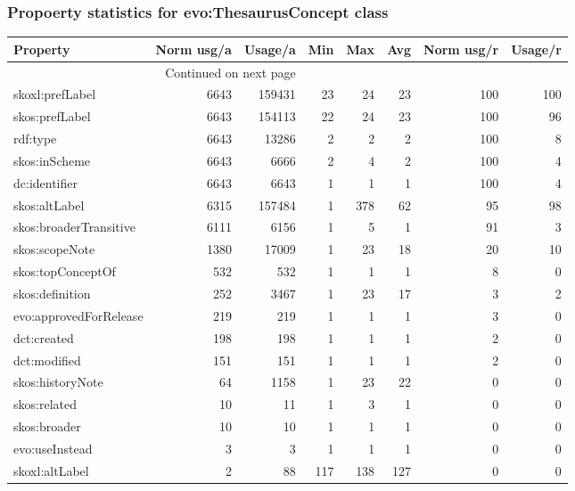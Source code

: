 \documentclass[10pt,a4paper,titlepage,final]{article}
\begin{document}
\subsubsection{Propoerty statistics for evo:ThesaurusConcept class}
\begin{longtable}{lrrrrrrr}
\toprule
               Property &  Norm usg/a &  Usage/a &  Min &  Max &  Avg &  Norm usg/r &  Usage/r \\
\midrule
\endhead
\midrule
\multicolumn{3}{r}{{Continued on next page}} \\
\midrule
\endfoot

\bottomrule
\endlastfoot
        skoxl:prefLabel &        6643 &   159431 &   23 &   24 &   23 &         100 &      100 \\
         skos:prefLabel &        6643 &   154113 &   22 &   24 &   23 &         100 &       96 \\
               rdf:type &        6643 &    13286 &    2 &    2 &    2 &         100 &        8 \\
          skos:inScheme &        6643 &     6666 &    2 &    4 &    2 &         100 &        4 \\
          dc:identifier &        6643 &     6643 &    1 &    1 &    1 &         100 &        4 \\
          skos:altLabel &        6315 &   157484 &    1 &  378 &   62 &          95 &       98 \\
 skos:broaderTransitive &        6111 &     6156 &    1 &    5 &    1 &          91 &        3 \\
         skos:scopeNote &        1380 &    17009 &    1 &   23 &   18 &          20 &       10 \\
      skos:topConceptOf &         532 &      532 &    1 &    1 &    1 &           8 &        0 \\
        skos:definition &         252 &     3467 &    1 &   23 &   17 &           3 &        2 \\
 evo:approvedForRelease &         219 &      219 &    1 &    1 &    1 &           3 &        0 \\
            dct:created &         198 &      198 &    1 &    1 &    1 &           2 &        0 \\
           dct:modified &         151 &      151 &    1 &    1 &    1 &           2 &        0 \\
       skos:historyNote &          64 &     1158 &    1 &   23 &   22 &           0 &        0 \\
           skos:related &          10 &       11 &    1 &    3 &    1 &           0 &        0 \\
           skos:broader &          10 &       10 &    1 &    1 &    1 &           0 &        0 \\
         evo:useInstead &           3 &        3 &    1 &    1 &    1 &           0 &        0 \\
         skoxl:altLabel &           2 &       88 &  117 &  138 &  127 &           0 &        0 \\
\end{longtable}
\end{document}
